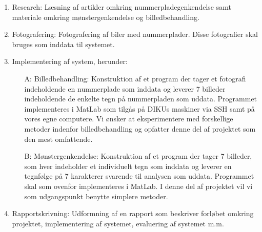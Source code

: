 \documentclass[12pt,a4paper,final]{report}
\begin{document}
\begin{enumerate}
\item Research: Læsning af artikler omkring nummerpladegenkendelse samt materiale omkring mønstergenkendelse og billedbehandling. %

\item Fotografering: Fotografering af biler med nummerplader. Disse fotografier skal bruges som inddata til systemet.%


\item Implementering af system, herunder:

\begin{itemize}
\item[A:] Billedbehandling: Konstruktion af et program der tager et fotografi indeholdende en nummerplade som inddata og leverer 7 billeder indeholdende de enkelte tegn på nummerpladen som uddata. Programmet implementeres i MatLab som tilgås på DIKUs maskiner via SSH samt på vores egne computere. Vi ønsker at eksperimentere med forskellige metoder indenfor billedbehandling og opfatter denne del af projektet som den mest omfattende.%

\item[B:] Mønstergenkendelse: Konstruktion af et program der tager 7 billeder, som hver indeholder et individuelt tegn som inddata og leverer en tegnfølge på 7 karakterer svarende til analysen som uddata. Programmet skal som ovenfor implementeres i MatLab. I denne del af projektet vil vi som udgangspunkt benytte simplere metoder.%

\end{itemize}





\item Rapportskrivning: Udformning af en rapport som beskriver forløbet omkring projektet, implementering af systemet, evaluering af systemet m.m. %


\end{enumerate}
\end{document}

